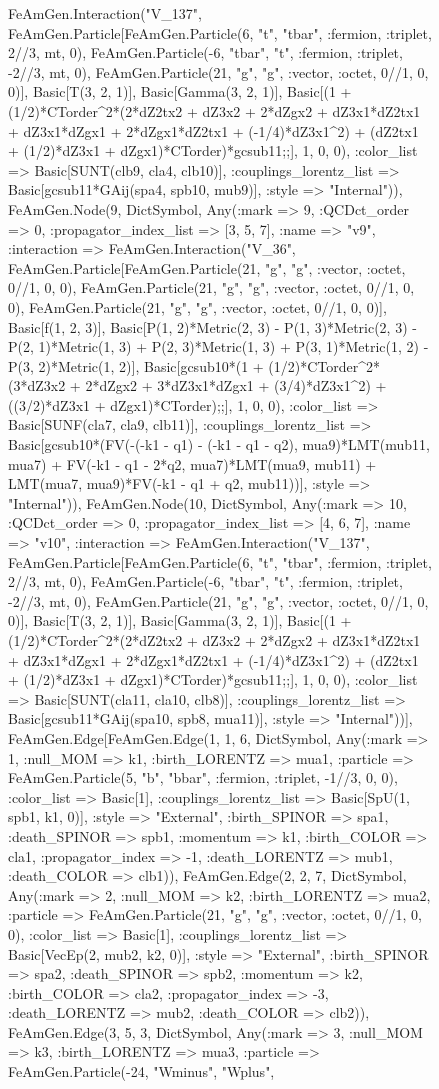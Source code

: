 \documentclass{revtex4}
\begin{document}
\begin{figure}[!htb]
\begin{center}
{FeAmGen.Interaction("V_137", FeAmGen.Particle[FeAmGen.Particle(6, "t", "tbar", :fermion, :triplet, 2//3, mt, 0), FeAmGen.Particle(-6, "tbar", "t", :fermion, :triplet, -2//3, mt, 0), FeAmGen.Particle(21, "g", "g", :vector, :octet, 0//1, 0, 0)], Basic[T(3, 2, 1)], Basic[Gamma(3, 2, 1)], Basic[(1 + (1/2)*CTorder^2*(2*dZ2tx2 + dZ3x2 + 2*dZgx2 + dZ3x1*dZ2tx1 + dZ3x1*dZgx1 + 2*dZgx1*dZ2tx1 + (-1/4)*dZ3x1^2) + (dZ2tx1 + (1/2)*dZ3x1 + dZgx1)*CTorder)*gcsub11;;], 1, 0, 0), :color_list => Basic[SUNT(clb9, cla4, clb10)], :couplings_lorentz_list => Basic[gcsub11*GAij(spa4, spb10, mub9)], :style => "Internal")), FeAmGen.Node(9, Dict{Symbol, Any}(:mark => 9, :QCDct_order => 0, :propagator_index_list => [3, 5, 7], :name => "v9", :interaction => FeAmGen.Interaction("V_36", FeAmGen.Particle[FeAmGen.Particle(21, "g", "g", :vector, :octet, 0//1, 0, 0), FeAmGen.Particle(21, "g", "g", :vector, :octet, 0//1, 0, 0), FeAmGen.Particle(21, "g", "g", :vector, :octet, 0//1, 0, 0)], Basic[f(1, 2, 3)], Basic[P(1, 2)*Metric(2, 3) - P(1, 3)*Metric(2, 3) - P(2, 1)*Metric(1, 3) + P(2, 3)*Metric(1, 3) + P(3, 1)*Metric(1, 2) - P(3, 2)*Metric(1, 2)], Basic[gcsub10*(1 + (1/2)*CTorder^2*(3*dZ3x2 + 2*dZgx2 + 3*dZ3x1*dZgx1 + (3/4)*dZ3x1^2) + ((3/2)*dZ3x1 + dZgx1)*CTorder);;], 1, 0, 0), :color_list => Basic[SUNF(cla7, cla9, clb11)], :couplings_lorentz_list => Basic[gcsub10*(FV(-(-k1 - q1) - (-k1 - q1 - q2), mua9)*LMT(mub11, mua7) + FV(-k1 - q1 - 2*q2, mua7)*LMT(mua9, mub11) + LMT(mua7, mua9)*FV(-k1 - q1 + q2, mub11))], :style => "Internal")), FeAmGen.Node(10, Dict{Symbol, Any}(:mark => 10, :QCDct_order => 0, :propagator_index_list => [4, 6, 7], :name => "v10", :interaction => FeAmGen.Interaction("V_137", FeAmGen.Particle[FeAmGen.Particle(6, "t", "tbar", :fermion, :triplet, 2//3, mt, 0), FeAmGen.Particle(-6, "tbar", "t", :fermion, :triplet, -2//3, mt, 0), FeAmGen.Particle(21, "g", "g", :vector, :octet, 0//1, 0, 0)], Basic[T(3, 2, 1)], Basic[Gamma(3, 2, 1)], Basic[(1 + (1/2)*CTorder^2*(2*dZ2tx2 + dZ3x2 + 2*dZgx2 + dZ3x1*dZ2tx1 + dZ3x1*dZgx1 + 2*dZgx1*dZ2tx1 + (-1/4)*dZ3x1^2) + (dZ2tx1 + (1/2)*dZ3x1 + dZgx1)*CTorder)*gcsub11;;], 1, 0, 0), :color_list => Basic[SUNT(cla11, cla10, clb8)], :couplings_lorentz_list => Basic[gcsub11*GAij(spa10, spb8, mua11)], :style => "Internal"))], FeAmGen.Edge[FeAmGen.Edge(1, 1, 6, Dict{Symbol, Any}(:mark => 1, :null_MOM => k1, :birth_LORENTZ => mua1, :particle => FeAmGen.Particle(5, "b", "bbar", :fermion, :triplet, -1//3, 0, 0), :color_list => Basic[1], :couplings_lorentz_list => Basic[SpU(1, spb1, k1, 0)], :style => "External", :birth_SPINOR => spa1, :death_SPINOR => spb1, :momentum => k1, :birth_COLOR => cla1, :propagator_index => -1, :death_LORENTZ => mub1, :death_COLOR => clb1)), FeAmGen.Edge(2, 2, 7, Dict{Symbol, Any}(:mark => 2, :null_MOM => k2, :birth_LORENTZ => mua2, :particle => FeAmGen.Particle(21, "g", "g", :vector, :octet, 0//1, 0, 0), :color_list => Basic[1], :couplings_lorentz_list => Basic[VecEp(2, mub2, k2, 0)], :style => "External", :birth_SPINOR => spa2, :death_SPINOR => spb2, :momentum => k2, :birth_COLOR => cla2, :propagator_index => -3, :death_LORENTZ => mub2, :death_COLOR => clb2)), FeAmGen.Edge(3, 5, 3, Dict{Symbol, Any}(:mark => 3, :null_MOM => k3, :birth_LORENTZ => mua3, :particle => FeAmGen.Particle(-24, "Wminus", "Wplus", }
\end{center}
\end{figure}
\end{document}
